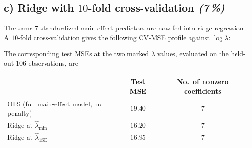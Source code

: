 \documentclass[11pt,a4paper]{article}
\newcommand{\subpoints}[1]{\textit{(#1\,\%)}}
\begin{document}
\subsection*{c) Ridge with $10$-fold cross-validation \subpoints{7}}
The same $7$ standardized main-effect predictors are now fed into ridge regression. A $10$-fold cross-validation gives the following CV-MSE profile against $\log \lambda$:

\begin{center}
\end{center}

\noindent The corresponding test MSEs at the two marked $\lambda$ values, evaluated on the held-out $106$ observations, are:
\begin{center}\small
\begin{tabular}{lcc}
\toprule
 & \textbf{Test MSE} & \textbf{No.\ of nonzero coefficients} \\
\midrule
OLS (full main-effect model, no penalty) & $19.40$ & $7$ \\
Ridge at $\hat\lambda_{\min}$            & $16.20$ & $7$ \\
Ridge at $\hat\lambda_{1\text{SE}}$      & $16.95$ & $7$ \\
\bottomrule
\end{tabular}
\end{center}
\end{document}
